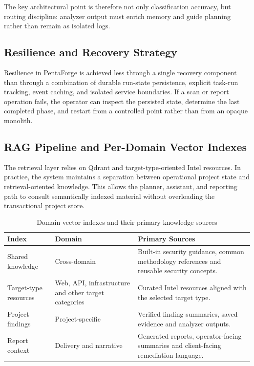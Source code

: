 \documentclass[12pt,a4paper]{report}
\begin{document}
The key architectural point is therefore not only classification accuracy, but
routing discipline: analyzer output must enrich memory and guide planning rather
than remain as isolated logs.

\subsection{Resilience and Recovery Strategy}

Resilience in PentaForge is achieved less through a single recovery component than
through a combination of durable run-state persistence, explicit task-run tracking,
event caching, and isolated service boundaries. If a scan or report operation fails,
the operator can inspect the persisted state, determine the last completed phase,
and restart from a controlled point rather than from an opaque monolith.

\subsection{RAG Pipeline and Per-Domain Vector Indexes}

The retrieval layer relies on Qdrant and target-type-oriented Intel resources. In
practice, the system maintains a separation between operational project state and
retrieval-oriented knowledge. This allows the planner, assistant, and reporting path
to consult semantically indexed material without overloading the transactional project
store.

\begin{table}[H]
    \centering
    \caption{Domain vector indexes and their primary knowledge sources}
    \label{tab:vector_indexes}
    \renewcommand{\arraystretch}{1.35}
    \begin{tabular}{|p{}|p{}|p{}|}
        \hline
        \textbf{Index} & \textbf{Domain} & \textbf{Primary Sources} \\
        \hline
        Shared knowledge & Cross-domain & Built-in security guidance, common methodology references and reusable security concepts. \\
        \hline
        Target-type resources & Web, API, infrastructure and other target categories & Curated Intel resources aligned with the selected target type. \\
        \hline
        Project findings & Project-specific & Verified finding summaries, saved evidence and analyzer outputs. \\
        \hline
        Report context & Delivery and narrative & Generated reports, operator-facing summaries and client-facing remediation language. \\
        \hline
    \end{tabular}
\end{table}
\end{document}
